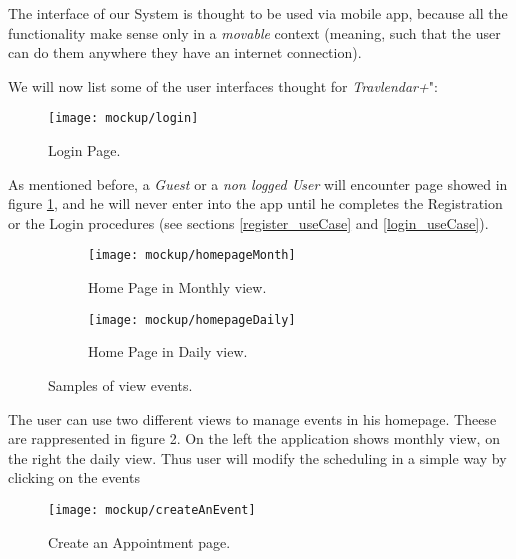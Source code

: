 The interface of our System is thought to be used via mobile app, because all the functionality make sense only in a \textit{movable} context (meaning, such that the user can do them anywhere they have an internet connection).

We will now list some of the user interfaces thought for \textit{Travlendar+}":

\begin{figure}[h]
	\texttt{[image: mockup/login]}
	\centering
	\caption{Login Page.}
	\label{fig:login}
\end{figure}
As mentioned before, a \textit{Guest} or a \textit{non logged User} will encounter page showed in figure \ref{fig:login}, and he will never enter into the app until he completes the Registration or the Login procedures (see sections \ref{register_useCase} and \ref{login_useCase}).

\begin{figure}[H]
	\begin{subfigure}{0.5\textwidth}
		\texttt{[image: mockup/homepageMonth]} 
		\centering
		\caption{Home Page in Monthly view.}
		\label{fig:homePage_Month}
	\end{subfigure}
	\begin{subfigure}{0.5\textwidth}
		\texttt{[image: mockup/homepageDaily]} 
		\centering
		\caption{Home Page in Daily view.}
		\label{fig:homePage_Day}
	\end{subfigure}
	\caption{Samples of view events.}
\end{figure}
The user can use two different views to manage events in his homepage. Theese are rappresented in figure 2. On the left the application shows monthly view, on the right the daily view. Thus user will modify the scheduling in a simple way by clicking on the events

\begin{figure}[h]
	\texttt{[image: mockup/createAnEvent]}
	\centering
	\caption{Create an Appointment page.}
	\label{fig:createEvent}
\end{figure}




